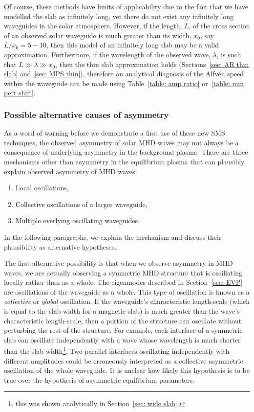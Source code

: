 \documentclass[12pt]{../style-files/ociamthesis}
\begin{document}
Of course, these methods have limits of applicability due to the fact that we have modelled the slab as infinitely long, yet there do not exist any infinitely long waveguides in the solar atmosphere. However, if the length, $L$, of the cross section of an observed solar waveguide is much greater than its width, $x_0$, say $L/x_0 = 5-10$, then this model of an infinitely long slab may be a valid approximation. Furthermore, if the wavelength of the observed wave, $\lambda$, is such that $L \gg \lambda \gg x_0$, then the thin slab approximation holds (Sections~\ref{sec: AR thin slab} and~\ref{sec: MPS thin}), therefore an analytical diagnosis of the Alfv\'{e}n speed within the waveguide can be made using Table~\ref{table: amp ratio} or~\ref{table: min pert shift}.


\subsubsection{Possible alternative causes of asymmetry}

As a word of warning before we demonstrate a first use of these new SMS techniques, the observed asymmetry of solar MHD waves may not always be a consequence of underlying asymmetry in the background plasma. There are three mechanisms other than asymmetry in the equilibrium plasma that can plausibly explain observed asymmetry of MHD waves:
\begin{enumerate}
	\item Local oscillations,
	\item Collective oscillations of a larger waveguide,
	\item Multiple overlying oscillating waveguides.
\end{enumerate}
In the following paragraphs, we explain the mechanism and discuss their plausibility as alternative hypotheses.

The first alternative possibility is that when we observe asymmetry in MHD waves, we are actually observing a symmetric MHD structure that is oscillating locally rather than as a whole. The eigenmodes described in Section~\ref{sec: EVP} are oscillations of the waveguide as a whole. This type of oscillation is known as a \textit{collective} or \textit{global} oscillation. If the waveguide's characteristic length-scale (which is equal to the slab width for a magnetic slab) is much greater than the wave's characteristic length-scale, then a portion of the structure can oscillate without perturbing the rest of the structure. For example, each interface of a symmetric slab can oscillate independently with a wave whose wavelength is much shorter than the slab width\footnote{this was shown analytically in Section~\ref{sec: wide slab}.}. Two parallel interfaces oscillating independently with different amplitudes could be erroneously interpreted as a collective asymmetric oscillation of the whole waveguide. It is unclear how likely this hypothesis is to be true over the hypothesis of asymmetric equilibrium parameters.
\end{document}
